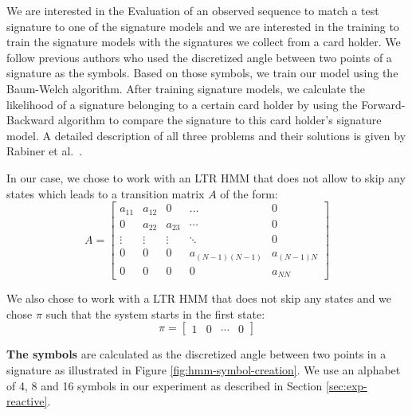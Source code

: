 \documentclass[a4paper, oneside]{csthesis}
\begin{document}
We are interested in the Evaluation of an observed sequence to match a test signature to one of the signature models and we are interested in the training to train the signature models with the signatures we collect from a card holder. We follow previous authors who used the discretized angle between two points of a signature as the symbols. Based on those symbols, we train our model using the Baum-Welch algorithm. After training signature models, we calculate the likelihood of a signature belonging to a certain card holder by using the Forward-Backward algorithm to compare the signature to this card holder's signature model. A detailed description of all three problems and their solutions is given by Rabiner et al.~\cite{rabiner1989tutorial}.

In our case, we chose to work with an LTR HMM that does not allow to skip any states which leads to a transition matrix $A$ of the form:
\begin{equation}
A = \left[\begin{array}{ccccc}a_{11} & a_{12} & 0 & \hdots & 0 \\0 & a_{22} & a_{23} & \cdots & 0 \\\vdots & \vdots & \vdots & \ddots & 0 \\0 & 0 & 0 & a_{(N-1)(N-1)} & a_{(N-1)N} \\0 & 0 & 0 & 0 & a_{NN}\end{array}\right]
\label{eq:hmm-transition-matrix}
\end{equation}


We also chose to work with a LTR HMM that does not skip any states and we chose $\pi$ such that the system starts in the first state:
$$\pi = \left[\begin{array}{cccc}1 & 0 & \cdots & 0\end{array}\right]$$


\textbf{The symbols} are calculated as the discretized angle between two points in a signature as illustrated in Figure \ref{fig:hmm-symbol-creation}. We use an alphabet of 4, 8 and 16 symbols in our experiment as described in Section \ref{sec:exp-reactive}.
\end{document}
